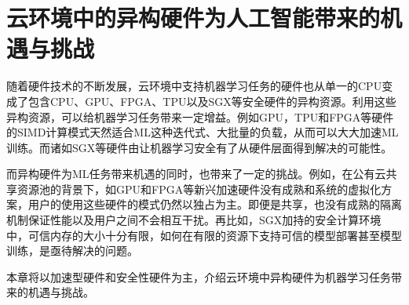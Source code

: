 
\chapter{云环境中的异构硬件为人工智能带来的机遇与挑战}
随着硬件技术的不断发展，云环境中支持机器学习任务的硬件也从单一的CPU变成了包含CPU、GPU、FPGA、TPU以及SGX等安全硬件的异构资源。利用这些异构资源，可以给机器学习任务带来一定增益。例如GPU，TPU和FPGA等硬件的SIMD计算模式天然适合ML这种迭代式、大批量的负载，从而可以大大加速ML训练。而诸如SGX等硬件由让机器学习安全有了从硬件层面得到解决的可能性。

而异构硬件为ML任务带来机遇的同时，也带来了一定的挑战。例如，在公有云共享资源池的背景下，如GPU和FPGA等新兴加速硬件没有成熟和系统的虚拟化方案，用户的使用这些硬件的模式仍然以独占为主。即便是共享，也没有成熟的隔离机制保证性能以及用户之间不会相互干扰。再比如，SGX加持的安全计算环境中，可信内存的大小十分有限，如何在有限的资源下支持可信的模型部署甚至模型训练，是亟待解决的问题。

本章将以加速型硬件和安全性硬件为主，介绍云环境中异构硬件为机器学习任务带来的机遇与挑战。

\section{}
